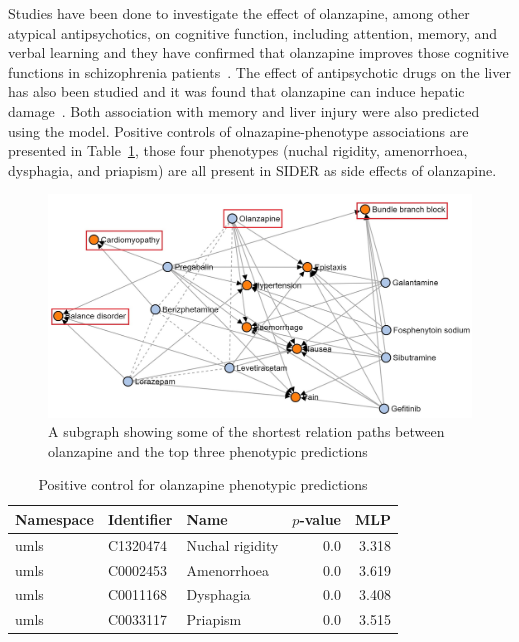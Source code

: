 Studies have been done to investigate the effect of olanzapine, among other atypical antipsychotics, on cognitive function, including attention, memory, and verbal learning and they have confirmed that olanzapine improves those cognitive functions in schizophrenia patients~\cite{mcgurk_cognitive_2004, smith_effects_2001, cuesta_effects_2001, purdon_neuropsychological_2000, bilder_neurocognitive_2002}.
The effect of antipsychotic drugs on the liver has also been studied and it was found that olanzapine can induce hepatic damage~\cite{lv_antipsychotic_2018}.
Both association with memory and liver injury were also predicted using the model.
Positive controls of olnazapine-phenotype associations are presented in Table~\ref{tab:ps_olanzapine}, those four phenotypes (nuchal rigidity, amenorrhoea, dysphagia, and priapism) are all present in \ac{SIDER} as side effects of olanzapine.

\begin{figure}[h!]
    \centering
    \includegraphics[scale=0.6]
    {figures/olanzapine_phenotypes.jpg}
    \caption[Olanzapine's path subgraph for all phenotypes]{\label{fig:olanzapine_phenotypes} A subgraph showing some of the shortest relation paths between olanzapine and the top three phenotypic predictions}
\end{figure}

\begin{table}
    \centering
    \begin{tabular}{|l|l|l|r|r|}
        \hline
        \textbf{Namespace} & \textbf{Identifier} & \textbf{Name} & \textbf{$p$-value} & \textbf{MLP} \\
        \hline
        umls & C1320474 & Nuchal rigidity & 0.0 & 3.318 \\
        \hline
        umls & C0002453 & Amenorrhoea & 0.0 & 3.619 \\
        \hline
        umls & C0011168 & Dysphagia & 0.0 & 3.408 \\
        \hline
        umls & C0033117 & Priapism & 0.0 & 3.515 \\
        \hline
    \end{tabular}
    \caption{Positive control for olanzapine phenotypic predictions}
    \label{tab:ps_olanzapine}
\end{table}



